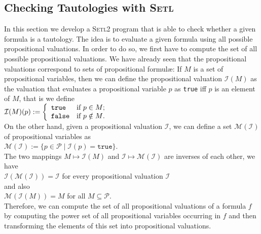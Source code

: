 \subsection{Checking Tautologies with \textsc{Setl}}
\noindent
In this section we develop a  \textsc{Setl2} program that is able to check whether a given formula
is a tautology.  The idea is to evaluate a given formula using all possible propositional valuations.
In order to do so, we first have to compute the set of all possible propositional valuations.  We
have already seen that the propositional valuations correspond to sets of propositional {formul\ae}:
If $M$ is a set of propositional variables, then we can define the propositional valuation
$\mathcal{I}(M)$ as the valuation that evaluates a propositional variable $p$ as \texttt{true}
iff $p$ is an element of $M$, that is we define
\\[0.2cm]
\hspace*{1.3cm}
$\mathcal{I}(M)(p) := \left\{
\begin{array}[c]{ll}
  \mathtt{true}  & \mbox{if $p \in M$;} \\
  \mathtt{false} & \mbox{if $p \notin M$.}
\end{array}
\right.
$
\\[0.2cm]
On the other hand, given a propositional valuation $\mathcal{I}$, we can define a set
$\mathcal{M}(\mathcal{I})$ of propositional variables as
\\[0.2cm]
\hspace*{1.3cm}
$\mathcal{M}(\mathcal{I}) := \bigl\{ p \in \mathcal{P} \mid \mathcal{I}(p) = \mathtt{true} \bigr\}$.
\\[0.2cm]
The two mappings  $M \mapsto \mathcal{I}(M)$ and 
$\mathcal{I} \mapsto \mathcal{M}(\mathcal{I})$ are inverses of each other, we have 
\\[0.2cm]
\hspace*{1.3cm}
$\mathcal{I}(\mathcal{M}(\mathcal{I})) = \mathcal{I}$ \quad for every propositional valuation $\mathcal{I}$
\\[0.2cm]
and also
\\[0.2cm]
\hspace*{1.3cm}
$\mathcal{M}(\mathcal{I}(M)) = M$ \quad for all $M \subseteq \mathcal{P}$.
\\[0.2cm]
Therefore, we can compute the set of all propositional valuations of a formula $f$ by computing the
power set of all propositional variables occurring in $f$ and then transforming the elements of this
set into propositional valuations.

